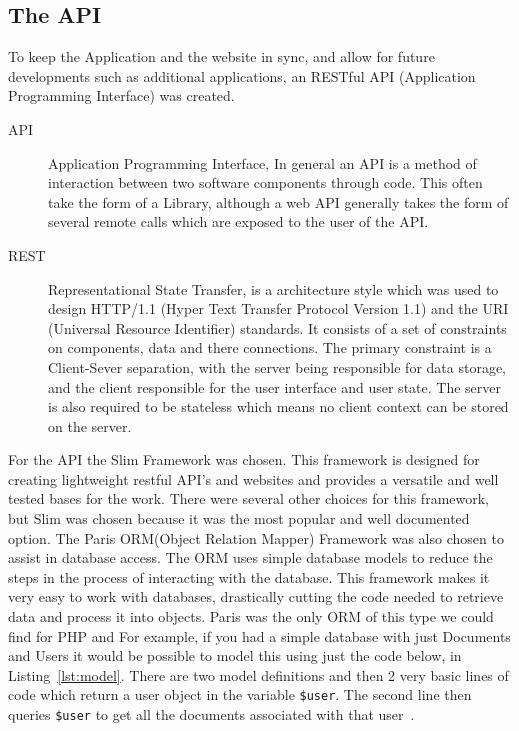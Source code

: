 \documentclass[11pt,a4paper]{article}
\begin{document}
\subsection{The API}
\label{sec:techAPI}
To keep the Application and the website in sync, and allow for future developments such as additional applications, an RESTful API (Application Programming Interface) was created.

\begin{description}
\item[API] Application Programming Interface, In general an API is a method of interaction between two software components through code. This often take the form of a Library, although a web API generally takes the form of several remote calls which are exposed to the user of the API.

\item[REST] Representational State Transfer, is a architecture style which was used to design HTTP/1.1 (Hyper Text Transfer Protocol Version 1.1) and the URI (Universal Resource Identifier) standards. It consists of a set of constraints on components, data and there connections. The primary constraint is a Client-Sever separation, with the server being responsible for data storage, and the client responsible for the user interface and user state. The server is also required to be stateless which means no client context can be stored on the server.
\end{description}

For the API the Slim Framework\cite{slim} was chosen. This framework is designed for creating lightweight restful API's and websites and provides a versatile and well tested bases for the work. There were several other choices for this framework, but Slim was chosen because it was the most popular and well documented option. The Paris ORM(Object Relation Mapper) Framework\cite{paris} was also chosen to assist in database access. The ORM uses simple database models to reduce the steps in the process of interacting with the database. This framework makes it very easy to work with databases, drastically cutting the code needed to retrieve data and process it into objects. Paris was the only ORM of this type we could find for PHP and  For example, if you had a simple database with just Documents and Users it would be possible to model this using just the code below, in Listing~\ref{lst:model}. There are two model definitions and then 2 very basic lines of code which return a user object in the variable \lstinline{$user}. The second line then queries \lstinline{$user} to get all the documents associated with that user~\cite{TomMilestone2}.
\end{document}
